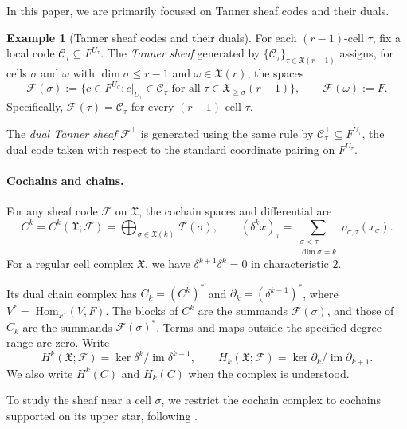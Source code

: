 \documentclass[11pt,letterpaper]{article}
\renewcommand{\le}{\leqslant}
\renewcommand{\ge}{\geqslant}
\theoremstyle{definition}
\newtheorem{example}[theorem]{Example}
\theoremstyle{remark}
\newcommand{\cF}{\mathcal F}
\newcommand{\X}{\mathfrak{X}}
\newcommand{\im}{\operatorname{im}}
\newcommand{\Hom}{\operatorname{Hom}}
\begin{document}
In this paper, we are primarily focused on Tanner sheaf codes and their duals.
\begin{example}[Tanner sheaf codes and their duals]
\label{ex:tanner-sheaf}\label{def:local-orthogonal-sheaf}
For each $(r-1)$-cell $\tau$, fix a local code
$\mathcal C_\tau\subseteq F^{U_\tau}$.
The \emph{Tanner sheaf} generated by
$\{\mathcal C_\tau\}_{\tau\in \X(r-1)}$
assigns, for cells $\sigma$ and $\omega$ with $\dim\sigma\le r-1$ and $\omega\in\X(r)$, the spaces
\begin{equation}
 \cF(\sigma):=
 \bigl\{c\in F^{U_\sigma}:c|_{U_\tau}\in\mathcal C_\tau
 \text{ for all }\tau\in\X_{\ge\sigma}(r-1)\bigr\},
 \qquad \cF(\omega):=F.
 \label{eq:sheaf-spaces}
\end{equation}
Specifically, $\cF(\tau)=\mathcal C_\tau$ for every $(r-1)$-cell $\tau$.

The \emph{dual Tanner sheaf} $\cF^\perp$ is generated using the same rule by
$\mathcal C_\tau^\perp\subseteq F^{U_\tau}$, the dual code taken with respect to the standard coordinate
pairing on $F^{U_\tau}$. 
\end{example}

\paragraph{Cochains and chains.}
\label{sec:sheaf-differential}
For any sheaf code $\cF$ on $\X$, the cochain spaces and differential are
\cite[Section~VI]{PanteleevKalachev2024}
\begin{equation*}
 C^k=C^k(\X;\cF)=
       \bigoplus_{\sigma\in \X(k)}\cF(\sigma),\qquad
 (\delta^k x)_\tau=
       \sum_{\substack{\sigma\lessdot\tau\\\dim\sigma=k}}
            \rho_{\sigma,\tau}(x_\sigma).
\end{equation*}
For a regular cell complex $\X$, we have $\delta^{k+1}\delta^k=0$
in characteristic $2$.

Its dual chain complex has $C_k=(C^k)^*$ and
$\partial_k=(\delta^{k-1})^*$, where $V^*=\Hom_F(V,F)$.
The blocks of $C^k$ are the summands $\cF(\sigma)$, and those of
$C_k$ are the summands $\cF(\sigma)^*$.
Terms and maps outside the specified degree range are zero. Write
\[
 H^k(\X;\cF)=\ker\delta^k/\im\delta^{k-1},\qquad
 H_k(\X;\cF)=\ker\partial_k/\im\partial_{k+1}.
\]
We also write $H^k(C)$ and $H_k(C)$ when the complex is understood.

To study the sheaf near a cell $\sigma$, we restrict the cochain complex
to cochains supported on its upper star, following
\cite[Eq.~(3.1) and Definition~3.6]{LiEtAl2025}.
\end{document}
